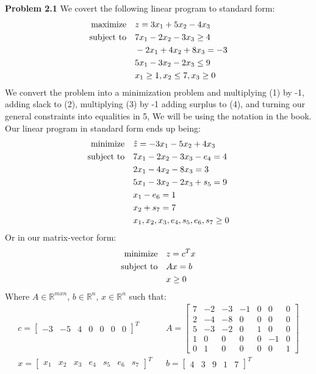 \documentclass{article}
\begin{document}
 
\pagestyle{fancy}
\textbf{Problem 2.1} We covert the following linear program to standard form:
\begin{align}
    \text{maximize} &\null \quad z = 3x_1 + 5x_2 - 4x_3 \\ 
    \text{subject to} &\null \quad 7x_1 - 2x_2 - 3x_3 \geq 4 \\
    & \quad -2x_1 + 4x_2 + 8x_3 = -3 \\
    & \quad 5x_1 - 3x_2 - 2x_3 \leq 9 \\
    & \quad x_1 \geq 1, x_2 \leq 7, x_3 \geq 0
\end{align}
We convert the problem into a minimization problem and multiplying (1) by -1, adding slack to (2), multiplying (3) by -1 adding surplus to (4), and turning our general constraints into equalities in 5, We will be using the notation in the book. Our linear program in standard form ends up being: \newline
{}
\begin{align}
    \text{minimize} &\null \quad \hat{z} = -3x_1 - 5x_2 + 4x_3 \\ 
    \text{subject to} &\null \quad 7x_1 - 2x_2 - 3x_3 - e_4 = 4 \\
    & \quad 2x_1 - 4x_2 - 8x_3 = 3 \\
    & \quad 5x_1 - 3x_2 - 2x_3 + s_5 = 9 \\
    & \quad x_1 - e_6 = 1 \\
    & \quad x_2 + s_7 = 7 \\
    & \quad x_1, x_2, x_3, e_4, s_5, e_6,s_7 \geq 0
\end{align}
Or in our matrix-vector form: 
\begin{align*}
    \text{minimize} &\null \quad z = c^Tx \\ 
    \text{subject to} &\null \quad Ax=b \\
    & \quad x \geq 0
\end{align*}
Where $A \in \mathbb{R}^{mxn}$, $b \in \mathbb{R}^n$, $x \in \mathbb{R}^n$ such that:  
\begin{align*}c = 
    \begin{bmatrix} 
        -3 & - 5 & 4 & 0 & 0 & 0 & 0
    \end{bmatrix}^T && A =  
    \begin{bmatrix}
        7 & -2 & -3 & -1 & 0 & 0 & 0 \\
        2 & -4 & -8 & 0 & 0 & 0 & 0 \\
        5 & -3 & -2 & 0 & 1 & 0 & 0 \\
        1 & 0 & 0 & 0 & 0 & -1 & 0 \\
        0 & 1 & 0 & 0 & 0 & 0 & 1
    \end{bmatrix} \\ x = 
    \begin{bmatrix}
        x_1 & x_2 & x_3 & e_4 & s_5 & e_6 & s_7
    \end{bmatrix}^T && b = 
    \begin{bmatrix}
        4 & 3 & 9 & 1 & 7
    \end{bmatrix}^T
\end{align*} \newline
\end{document}
